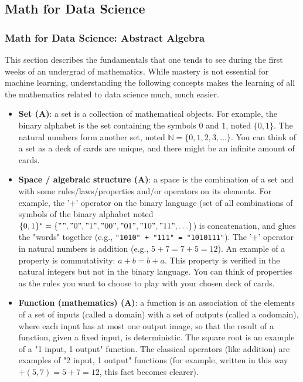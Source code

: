 \documentclass{article}
\begin{document}
\subsection*{Math for Data Science}

\subsubsection*{Math for Data Science: Abstract Algebra}

This section describes the fundamentals that one tends to see during the first weeks of an undergrad of mathematics. While mastery is not essential for machine learning, understanding the following concepts makes the learning of all the mathematics related to data science much, much easier.

\begin{itemize}

	\item \textbf{Set (A)}: a set is a collection of mathematical objects. For example, the binary alphabet is the set containing the symbols $0$ and $1$, noted $\{0, 1\}$. The natural numbers form another set, noted $\mathbb{N} = \{0, 1, 2, 3, \dots\}$. You can think of a set as a deck of cards are unique, and there might be an infinite amount of cards.

	\item \textbf{Space / algebraic structure (A)}: a space is the combination of a set and with some rules/laws/properties and/or operators on its elements. For example, the '+' operator on the binary language (set of all combinations of symbols of the binary alphabet noted $\{0, 1\}^* = \{"", "0", "1", "00", "01", \\ "10", "11", \ldots\}$) is concatenation, and glues the "words" together (e.g., \texttt{"1010" + "111" = "1010111"}). The '+' operator in natural numbers is addition (e.g., $5 + 7 = 7 + 5 = 12$). An example of a property is commutativity: $a + b = b + a$. This property is verified in the natural integers but not in the binary language. You can think of properties as the rules you want to choose to play with your chosen deck of cards.

	\item \textbf{Function (mathematics) (A)}: a function is an association of the elements of a set of inputs (called a domain) with a set of outputs (called a codomain), where each input has at most one output image, so that the result of a function, given a fixed input, is deterministic. The square root is an example of a "1 input, 1 output" function. The classical operators (like addition) are examples of "2 input, 1 output" functions (for example, written in this way $+(5, 7) = 5 + 7 = 12$, this fact becomes clearer).


\end{itemize}
\end{document}
